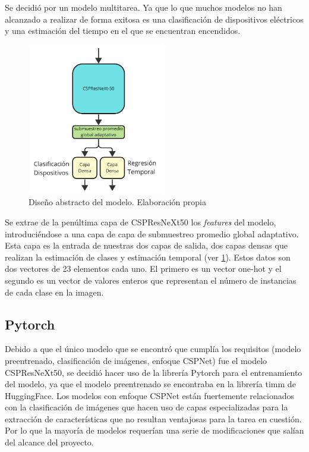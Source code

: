 Se decidió por un modelo multitarea. Ya que lo que muchos modelos no han alcanzado a realizar de forma exitosa es una clasificación de dispositivos eléctricos y una estimación del tiempo en el que se encuentran encendidos.

\begin{figure}[H]
    \centering
    \includegraphics[height=250px]{images/modelo_IA.pdf}
    \caption{Diseño abstracto del modelo. Elaboración propia}
    \label{diagramaIA}
\end{figure}

Se extrae de la penúltima capa de CSPResNeXt50 los \textit{features} del modelo, introduciéndose a una capa de capa de submuestreo promedio global adaptativo. Esta capa es la entrada de nuestras dos capas de salida, dos capas densas que realizan la estimación de clases y estimación temporal (ver \ref{diagramaIA}).
Estos datos son dos vectores de 23 elementos cada uno. El primero es un vector one-hot y el segundo es un vector de valores enteros que representan el número de instancias de cada clase en la imagen.

\subsection{Pytorch}
Debido a que el único modelo que se encontró que cumplía los requisitos (modelo preentrenado, clasificación de imágenes, enfoque CSPNet) fue el modelo CSPResNeXt50, se decidió hacer uso de la librería Pytorch para el entrenamiento del modelo, ya que el modelo preentrenado se encontraba en la librería timm de HuggingFace.
Los modelos con enfoque CSPNet están fuertemente relacionados con la clasificación de imágenes que hacen uso de capas especializadas para la extracción de características que no resultan ventajosas para la tarea en cuestión. Por lo que la mayoría de modelos requerían una serie de modificaciones que salían del alcance del proyecto.

